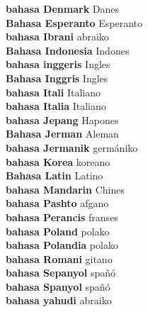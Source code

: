 \textbf{ bahasa Denmark  } Danes \\
\textbf{ Bahasa Esperanto  } Esperanto \\
\textbf{ bahasa Ibrani  } abraiko \\
\textbf{ Bahasa Indonesia  } Indones \\
\textbf{ bahasa inggeris  } Ingles \\
\textbf{ Bahasa Inggris  } Ingles \\
\textbf{ bahasa Itali  } Italiano \\
\textbf{ bahasa Italia  } Italiano \\
\textbf{ bahasa Jepang  } Hapones \\
\textbf{ Bahasa Jerman  } Aleman \\
\textbf{ bahasa Jermanik  } germániko \\
\textbf{ bahasa Korea  } koreano \\
\textbf{ Bahasa Latin  } Latino \\
\textbf{ bahasa Mandarin  } Chines \\
\textbf{ bahasa Pashto  } afgano \\
\textbf{ bahasa Perancis  } franses \\
\textbf{ bahasa Poland  } polako \\
\textbf{ bahasa Polandia  } polako \\
\textbf{ bahasa Romani  } gitano \\
\textbf{ bahasa Sepanyol  } spañó \\
\textbf{ bahasa Spanyol  } spañó \\
\textbf{ bahasa yahudi  } abraiko \\
